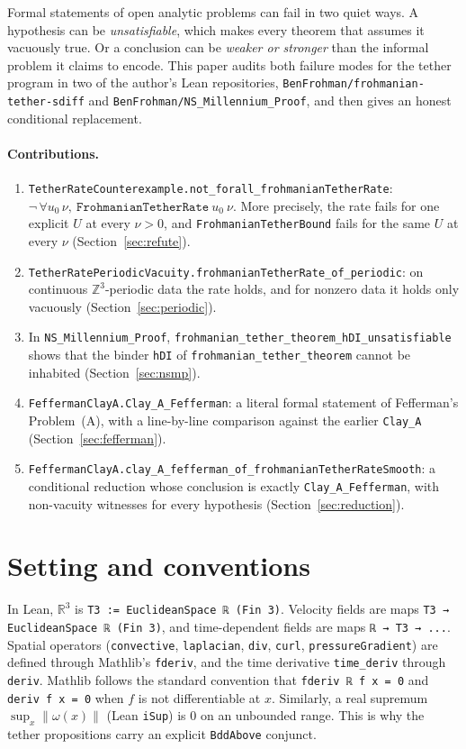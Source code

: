 \documentclass[11pt,a4paper]{article}
\theoremstyle{definition}
\theoremstyle{remark}
\newcommand{\R}{\mathbb{R}}
\newcommand{\Z}{\mathbb{Z}}
\newcommand{\lean}[1]{\texttt{#1}}
\begin{document}
Formal statements of open analytic problems can fail in two quiet ways. A hypothesis can be \emph{unsatisfiable}, which makes every theorem that assumes it vacuously true. Or a conclusion can be \emph{weaker or stronger} than the informal problem it claims to encode. This paper audits both failure modes for the tether program in two of the author's Lean repositories, \lean{BenFrohman/frohmanian-tether-sdiff} and \lean{BenFrohman/NS\_Millennium\_Proof}, and then gives an honest conditional replacement.

\paragraph{Contributions.}
\begin{enumerate}[label=(\arabic*)]
\item \lean{TetherRateCounterexample.not\_forall\_frohmanianTetherRate}: $\neg\,\forall u_0\,\nu,\ \lean{FrohmanianTetherRate}\ u_0\ \nu$. More precisely, the rate fails for one explicit $U$ at every $\nu>0$, and \lean{FrohmanianTetherBound} fails for the same $U$ at every $\nu$ (Section~\ref{sec:refute}).
\item \lean{TetherRatePeriodicVacuity.frohmanianTetherRate\_of\_periodic}: on continuous $\Z^3$-periodic data the rate holds, and for nonzero data it holds only vacuously (Section~\ref{sec:periodic}).
\item In \lean{NS\_Millennium\_Proof}, \lean{frohmanian\_tether\_theorem\_hDI\_unsatisfiable} shows that the binder \lean{hDI} of \lean{frohmanian\_tether\_theorem} cannot be inhabited (Section~\ref{sec:nsmp}).
\item \lean{FeffermanClayA.Clay\_A\_Fefferman}: a literal formal statement of Fefferman's Problem~(A), with a line-by-line comparison against the earlier \lean{Clay\_A} (Section~\ref{sec:fefferman}).
\item \lean{FeffermanClayA.clay\_A\_fefferman\_of\_frohmanianTetherRateSmooth}: a conditional reduction whose conclusion is exactly \lean{Clay\_A\_Fefferman}, with non-vacuity witnesses for every hypothesis (Section~\ref{sec:reduction}).
\end{enumerate}

\section{Setting and conventions}\label{sec:setting}

In Lean, $\R^3$ is \lean{T3 := EuclideanSpace ℝ (Fin 3)}. Velocity fields are maps \lean{T3 → EuclideanSpace ℝ (Fin 3)}, and time-dependent fields are maps \lean{ℝ → T3 → ...}. Spatial operators (\lean{convective}, \lean{laplacian}, \lean{div}, \lean{curl}, \lean{pressureGradient}) are defined through Mathlib's \lean{fderiv}, and the time derivative \lean{time\_deriv} through \lean{deriv}. Mathlib follows the standard convention that \lean{fderiv ℝ f x = 0} and \lean{deriv f x = 0} when $f$ is not differentiable at $x$. Similarly, a real supremum $\sup_x\|\omega(x)\|$ (Lean \lean{iSup}) is $0$ on an unbounded range. This is why the tether propositions carry an explicit \lean{BddAbove} conjunct.
\end{document}
